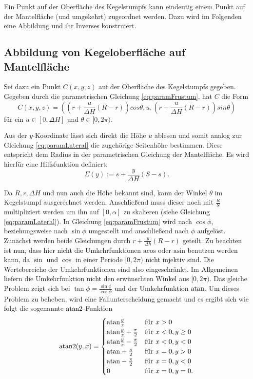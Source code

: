 \newpage
Ein Punkt auf der Oberfläche des Kegelstumpfs kann eindeutig einem Punkt auf der Mantelfläche (und umgekehrt) zugeordnet werden. Dazu wird im Folgenden eine Abbildung und ihr Inverses konstruiert.

\subsection{Abbildung von Kegeloberfläche auf Mantelfläche}
Sei dazu ein Punkt $C(x,y,z)$ auf der Oberfläche des Kegelstumpfs gegeben. Gegeben durch die parametrischen Gleichung \ref{eq:paramFrustum}, hat $C$ die Form
\[
C(x,y,z) = \left(\left(r + \frac{u}{\Delta H} (R - r)\right)cos \theta, u, \left(r + \frac{u}{\Delta H} (R - r)\right)sin \theta\right)
\]  für ein $u\in [0, \Delta H]$ und $\theta \in [0, 2\pi)$.

Aus der $y$-Koordinate lässt sich direkt die Höhe $u$ ablesen und somit analog zur Gleichung \ref{eq:paramLateral} die zugehörige Seitenhöhe bestimmen. Diese entspricht dem Radius in der parametrischen Gleichung  der Mantelfläche.  Es wird hierfür eine Hilfsfunktion definiert:
\begin{equation} \label{eq:help1}
	\Sigma(y) := s + \frac{y}{\Delta H} (S-s).
\end{equation}


Da $R, r, \Delta H$  und nun auch die Höhe bekannt sind, kann der Winkel $\theta$ im Kegelstumpf ausgerechnet werden. Anschließend muss dieser noch mit  $\frac{R}{S}$ multipliziert werden um ihn auf $[0, \alpha]$ zu skalieren (siehe Gleichung \ref{eq:paramLateral}).  In Gleichung \ref{eq:paramFrustum} wird nach $\cos\phi$, beziehungsweise nach $\sin\phi$ umgestellt und anschließend nach $\phi$ aufgelöst. 
Zunächst werden beide Gleichungen durch $r + \frac{y}{\Delta h} (R - r)$ geteilt. Zu beachten ist nun, dass hier nicht die Umkehrfunktionen $\text{acos}$ oder $\text{asin}$ benutzen werden kann, da $\sin$ und $\cos$ in einer Periode $[0, 2\pi)$ nicht injektiv sind. Die Wertebereiche der Umkehrfunktionen sind also eingeschränkt. Im Allgemeinen liefern die Umkehrfunktion nicht den erwünschten Winkel aus $[0, 2\pi)$.
Das gleiche Problem zeigt sich bei $\tan\phi = \frac{\sin\phi}{\cos\phi}$ und der Umkehrfunktion $\text{atan}$. Um dieses Problem zu beheben, wird eine Fallunterscheidung gemacht und es ergibt sich wie folgt die sogenannte $\text{atan2}$-Funktion
\[
\text{atan2}(y,x) = 	\begin{cases}
					\text{atan} \frac{y}{x} 					& \mbox{für } x > 0 \\
					\text{atan} \frac{y}{x} + \frac{\pi}{2}	& \mbox{für } x < 0, y \geq 0 \\
					\text{atan} \frac{y}{x} - \frac{\pi}{2}	& \mbox{für } x < 0, y < 0 \\
					\text{atan} +\frac{\pi}{2}				& \mbox{für } x = 0, y > 0 \\
					\text{atan} -\frac{\pi}{2}				& \mbox{für } x = 0, y < 0 \\
					0									& \mbox{für } x = 0, y = 0.
				\end{cases}
\]

